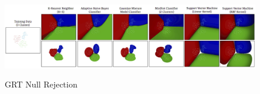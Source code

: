 \begin{figure}
	[h] \centering 
	\includegraphics[height=35mm]{figures/content/grt-null.jpg} \caption{GRT Null Rejection} \label{fg:grt:null} 
\end{figure}
